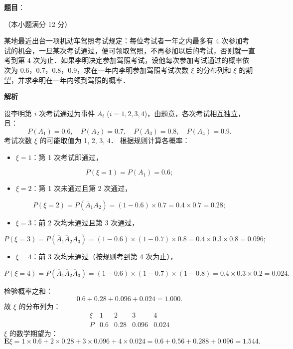 \begin{answer}

\textbf{题目}：

（本小题满分 12 分）

某地最近出台一项机动车驾照考试规定：每位考试者一年之内最多有 4 次参加考试的机会，一旦某次考试通过，便可领取驾照，不再参加以后的考试，否则就一直考到第 4 次为止．如果李明决定参加驾照考试，设他每次参加考试通过的概率依次为 0.6，0.7，0.8，0.9，求在一年内李明参加驾照考试次数 $\xi$ 的分布列和 $\xi$ 的期望，并求李明在一年内领到驾照的概率．

\textbf{解析}

设李明第 $i$ 次考试通过为事件 $A_i$ ($i = 1, 2, 3, 4$)，由题意，各次考试相互独立，且：
\nopagebreak[4]
\[
P(A_1) = 0.6, \quad P(A_2) = 0.7, \quad P(A_3) = 0.8, \quad P(A_4) = 0.9.
\]
考试次数 $\xi$ 的可能取值为 1, 2, 3, 4．
根据规则计算各概率：
\begin{itemize}
\item $\xi = 1$：第 1 次考试即通过，
\end{itemize}
\nopagebreak[4]
\[
P(\xi = 1) = P(A_1) = 0.6;
\]
\begin{itemize}
\item $\xi = 2$：第 1 次未通过且第 2 次通过，
\end{itemize}
\nopagebreak[4]
\[
P(\xi = 2) = P(\overline{A}_1 A_2) = (1 - 0.6) \times 0.7 = 0.4 \times 0.7 = 0.28;
\]
\begin{itemize}
\item $\xi = 3$：前 2 次均未通过且第 3 次通过，
\end{itemize}
\nopagebreak[4]
\[
P(\xi = 3) = P(\overline{A}_1 \overline{A}_2 A_3) = (1 - 0.6) \times (1 - 0.7) \times 0.8 = 0.4 \times 0.3 \times 0.8 = 0.096;
\]
\begin{itemize}
\item $\xi = 4$：前 3 次均未通过（按规则考到第 4 次为止），
\end{itemize}
\nopagebreak[4]
\[
P(\xi = 4) = P(\overline{A}_1 \overline{A}_2 \overline{A}_3) = (1 - 0.6) \times (1 - 0.7) \times (1 - 0.8) = 0.4 \times 0.3 \times 0.2 = 0.024.
\]

检验概率之和：
\nopagebreak[4]
\[
0.6 + 0.28 + 0.096 + 0.024 = 1.000.
\]
故 $\xi$ 的分布列为：
\nopagebreak[4]
\[
\begin{array}{c|cccc}
\xi & 1 & 2 & 3 & 4 \\ \hline
P & 0.6 & 0.28 & 0.096 & 0.024
\end{array}
\]
$\xi$ 的数学期望为：
\nopagebreak[4]
\[
\mathbf{E}\xi = 1 \times 0.6 + 2 \times 0.28 + 3 \times 0.096 + 4 \times 0.024 = 0.6 + 0.56 + 0.288 + 0.096 = 1.544.
\]


\end{answer}
